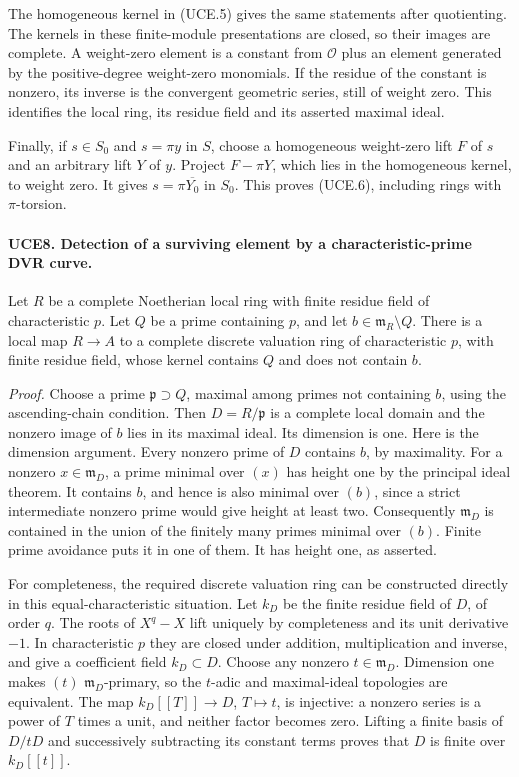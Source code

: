 The homogeneous kernel in (UCE.5) gives the same statements after
quotienting.  The kernels in these finite-module presentations are
closed, so their images are complete.  A weight-zero element is
a constant from \(\mathcal O\) plus an element generated by the
positive-degree weight-zero monomials.  If the residue of the
constant is nonzero, its inverse is the convergent geometric series,
still of weight zero.  This identifies the local ring, its residue
field and its asserted maximal ideal.

Finally, if \(s\in S_0\) and \(s=\pi y\) in \(S\), choose
a homogeneous weight-zero lift \(F\) of \(s\) and an arbitrary
lift \(Y\) of \(y\).  Project \(F-\pi Y\), which lies in
the homogeneous kernel, to weight zero.  It gives
\(s=\pi\overline{Y_0}\) in \(S_0\).  This proves (UCE.6),
including rings with \(\pi\)-torsion.

\paragraph{UCE8. Detection of a surviving element by a characteristic-prime DVR curve.}
\label{claim:UCE8}
Let \(R\) be a complete Noetherian local ring with finite residue
field of characteristic \(p\).  Let \(Q\) be a prime containing
\(p\), and let \(b\in\mathfrak m_R\setminus Q\).  There is
a local map \(R\to A\) to a complete discrete valuation ring of
characteristic \(p\), with finite residue field, whose kernel
contains \(Q\) and does not contain \(b\).

\emph{Proof.}
Choose a prime \(\mathfrak p\supset Q\), maximal among primes
not containing \(b\), using the ascending-chain condition.
Then \(D=R/\mathfrak p\) is a complete local domain and the
nonzero image of \(b\) lies in its maximal ideal.  Its dimension
is one.  Here is the dimension argument.  Every nonzero prime of
\(D\) contains \(b\), by maximality.  For a nonzero
\(x\in\mathfrak m_D\), a prime minimal over \((x)\) has
height one by the principal ideal theorem.  It contains \(b\),
and hence is also minimal over \((b)\), since a strict intermediate
nonzero prime would give height at least two.  Consequently
\(\mathfrak m_D\) is contained in the union of the finitely many
primes minimal over \((b)\).  Finite prime avoidance puts it in
one of them.  It has height one, as asserted.

For completeness, the required discrete valuation ring can be
constructed directly in this equal-characteristic situation.
Let \(k_D\) be the finite residue field of \(D\), of order \(q\).
The roots of \(X^q-X\) lift uniquely by completeness and its unit
derivative \(-1\).  In characteristic \(p\) they are closed
under addition, multiplication and inverse, and give a coefficient
field \(k_D\subset D\).  Choose any nonzero
\(t\in\mathfrak m_D\).  Dimension one makes \((t)\)
\(\mathfrak m_D\)-primary, so the \(t\)-adic and maximal-ideal
topologies are equivalent.  The map \(k_D[[T]]\to D\),
\(T\mapsto t\), is injective: a nonzero series is a power of
\(T\) times a unit, and neither factor becomes zero.  Lifting a
finite basis of \(D/tD\) and successively subtracting its constant
terms proves that \(D\) is finite over \(k_D[[t]]\).

